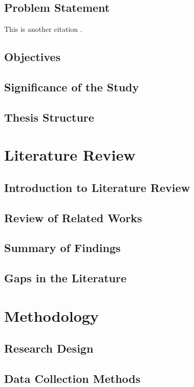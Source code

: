 \documentclass[12pt]{report}
\begin{document}
\section{Problem Statement}
This is another citation \cite{doe2019}.
\lipsum[1] %
\section{Objectives}
\lipsum[1] %
\section{Significance of the Study}
\lipsum[1] %
\section{Thesis Structure}
\lipsum[1] %

\chapter{Literature Review}
\section{Introduction to Literature Review}
\lipsum[1] %
\section{Review of Related Works}
\lipsum[1] %
\section{Summary of Findings}
\lipsum[1] %
\section{Gaps in the Literature}
\lipsum[1] %

\chapter{Methodology}
\section{Research Design}
\lipsum[1] %
\section{Data Collection Methods}
\lipsum[1] %
\end{document}
